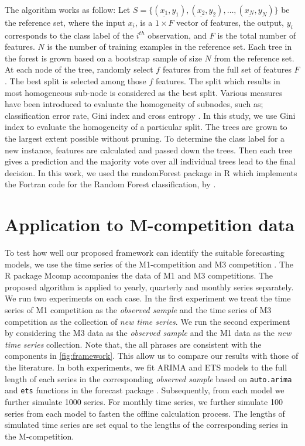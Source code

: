 \documentclass[11pt,a4paper,]{article}
\theoremstyle{definition}
\theoremstyle{definition}
\theoremstyle{definition}
\theoremstyle{remark}
\begin{document}
The algorithm works as follow: Let
\(S=\{(\underline{x_1}, y_1), (\underline{x_2}, y_2), \dots, (\underline{x_N}, y_N)\}\)
be the reference set, where the input \(\underline{x_i}\), is a
\(1\times F\) vector of features, the output, \(y_i\) corresponds to the
class label of the \(i^{th}\) observation, and \(F\) is the total number
of features. \(N\) is the number of training examples in the reference
set. Each tree in the forest is grown based on a bootstrap sample of
size \(N\) from the reference set. At each node of the tree, randomly
select \(f\) features from the full set of features \(F\). The best
split is selected among those \(f\) features. The split which results in
most homogeneous sub-node is considered as the best split. Various
measures have been introduced to evaluate the homogeneity of subnodes,
such as; classification error rate, Gini index and cross entropy
\autocite{friedman2001elements}. In this study, we use Gini index to
evaluate the homogeneity of a particular split. The trees are grown to
the largest extent possible without pruning. To determine the class
label for a new instance, features are calculated and passed down the
trees. Then each tree gives a prediction and the majority vote over all
individual trees lead to the final decision. In this work, we used the
randomForest package \autocite{liaw2002randomforest} in R which
implements the Fortran code for the Random Forest classification, by
\textcite{breiman2004random}.

\section{Application to M-competition data}\label{Mcomp}

To test how well our proposed framework can identify the suitable
forecasting models, we use the time series of the M1-competition
\autocite{makridakis1982accuracy} and M3 competition
\autocite{makridakis2000m3}. The R package Mcomp \autocite{hyndmanmcomp}
accompanies the data of M1 and M3 competitions. The proposed algorithm
is applied to yearly, quarterly and monthly series separately. We run
two experiments on each case. In the first experiment we treat the time
series of M1 competition as the \emph{observed sample} and the time
series of M3 competition as the collection of \emph{new time series}. We
run the second experiment by considering the M3 data as the
\emph{observed sample} and the M1 data as the \emph{new time series}
collection. Note that, the all phrases are consistent with the
components in \autoref{fig:framework}. This allow us to compare our
results with those of the literature. In both experiments, we fit ARIMA
and ETS models to the full length of each series in the corresponding
\emph{observed sample} based on \texttt{auto.arima} and \texttt{ets}
functions in the forecast package \autocite{Hyndman2008}. Subsequently,
from each model we further simulate 1000 series. For monthly time
series, we further simulate 100 series from each model to fasten the
offline calculation process. The lengths of simulated time series are
set equal to the lengths of the corresponding series in the
M-competition.
\end{document}
